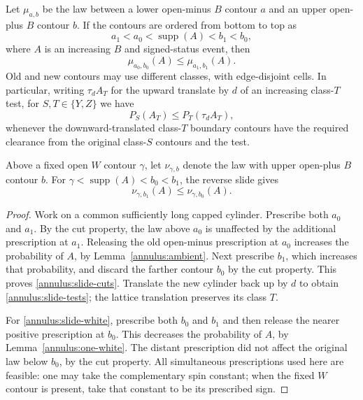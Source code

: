 \begin{lemma}\label{annulus:slide}
Let $\mu_{a,b}$ be the law between a lower open-minus $B$ contour $a$
and an upper open-plus $B$ contour $b$. If the contours are ordered
from bottom to top as
\[
 a_1<a_0<\operatorname{supp}(A)<b_1<b_0,
\]
where $A$ is an increasing $B$ and signed-status event, then
\begin{equation}\label{annulus:slide-cuts}
 \mu_{a_0,b_0}(A)\le \mu_{a_1,b_1}(A).
\end{equation}
Old and new contours may use different classes, with edge-disjoint cells.
In particular, writing $\tau_d A_T$ for the upward translate by $d$ of
an increasing class-$T$ test, for $S,T\in\{Y,Z\}$ we have
\begin{equation}\label{annulus:slide-tests}
 P_S(A_T)\le P_T(\tau_d A_T),
\end{equation}
whenever the downward-translated class-$T$ boundary contours have the
required clearance from the original class-$S$ contours and the test.

Above a fixed open $W$ contour $\gamma$, let $\nu_{\gamma,b}$ denote
the law with upper open-plus $B$ contour $b$. For
$\gamma<\operatorname{supp}(A)<b_0<b_1$, the reverse slide gives
\begin{equation}\label{annulus:slide-white}
 \nu_{\gamma,b_1}(A)\le\nu_{\gamma,b_0}(A).
\end{equation}
\end{lemma}
\begin{proof}
Work on a common sufficiently long capped cylinder. Prescribe both
$a_0$ and $a_1$. By the cut property, the law above $a_0$ is unaffected
by the additional prescription at $a_1$. Releasing the old open-minus
prescription at $a_0$ increases the probability of $A$, by
Lemma~\ref{annulus:ambient}. Next prescribe $b_1$, which increases that
probability, and discard the farther contour $b_0$ by the cut property.
This proves \eqref{annulus:slide-cuts}. Translate the new cylinder back
up by $d$ to obtain \eqref{annulus:slide-tests}; the lattice translation
preserves its class $T$.

For \eqref{annulus:slide-white}, prescribe both $b_0$ and $b_1$ and then
release the nearer positive prescription at $b_0$. This decreases the
probability of $A$, by Lemma~\ref{annulus:one-white}. The distant
prescription did not affect the original law below $b_0$, by the cut
property. All simultaneous prescriptions used here are feasible: one
may take the complementary spin constant; when the fixed $W$ contour
is present, take that constant to be its prescribed sign.
\end{proof}

